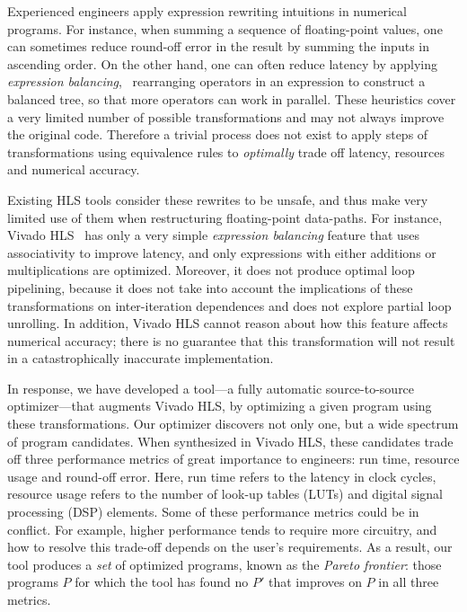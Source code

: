 Experienced engineers apply expression rewriting intuitions in numerical
programs.  For instance, when summing a sequence of floating-point values, one
can sometimes reduce round-off error in the result by summing the inputs in
ascending order.  On the other hand, one can often reduce latency by applying
\emph{expression balancing}, \ie~rearranging operators in an expression to
construct a balanced tree, so that more operators can work in parallel.  These
heuristics cover a very limited number of possible transformations and may not
always improve the original code.  Therefore a trivial process does not exist
to apply steps of transformations using equivalence rules to \emph{optimally}
trade off latency, resources and numerical accuracy.

Existing HLS tools consider these rewrites to be unsafe, and thus make very
limited use of them when restructuring floating-point data-paths.  For
instance, Vivado HLS~\cite{vivado_hls} has only a very simple \emph{expression
balancing} feature that uses associativity to improve latency, and only
expressions with either additions or multiplications are optimized.  Moreover,
it does not produce optimal loop pipelining, because it does not take
into account the implications of these transformations on inter-iteration
dependences and does not explore partial loop unrolling.  In addition, Vivado
HLS cannot reason about how this feature affects numerical accuracy; there is
no guarantee that this transformation will not result in a catastrophically
inaccurate implementation.

In response, we have developed a tool---a fully automatic source-to-source
optimizer---that augments Vivado HLS, by optimizing a given program using these
transformations.  Our optimizer discovers not only one, but a wide spectrum of
program candidates.  When synthesized in Vivado HLS, these candidates trade
off three performance metrics of great importance to engineers: run time,
resource usage and round-off error.  Here, run time refers to the latency in
clock cycles, resource usage refers to the number of look-up tables (LUTs)
and digital signal processing (DSP) elements.  Some of these performance
metrics could be in conflict.  For example, higher performance tends to
require more circuitry, and how to resolve this trade-off depends on the
user's requirements.  As a result, our tool produces a \emph{set} of optimized
programs, known as the \emph{Pareto frontier}: those programs $P$ for which the
tool has found no $P'$ that improves on $P$ in all three metrics.

